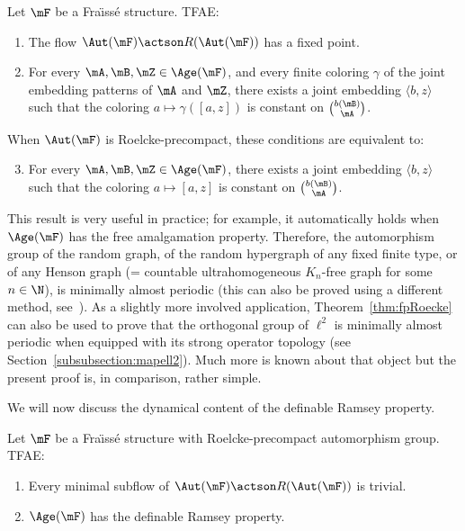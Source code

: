 \begin{theo}\label{thm:fpRoecke}
Let $\mF$ be a Fra\"{\i}ss\'e structure. TFAE:
\begin{enumerate}
\item \label{1.7.1} The flow $\Aut(\mF)\actson R(\Aut(\mF))$ has a fixed point.
\item \label{1.7.2} For every $\mA, \mB, \mZ\in \Age(\mF)$, and every finite coloring $\gamma$ of the joint embedding patterns of $\mA$ and $\mZ$, there exists a joint embedding $\langle b,z\rangle$ such that the coloring $a\mapsto \gamma([a,z])$ is constant on $\binom{b(\mB)}{\mA}$.
\end{enumerate}

When $\Aut(\mF)$ is Roelcke-precompact, these conditions are equivalent to:
\begin{enumerate}
\setcounter{enumi}{2}
\item \label{1.7.3} For every $\mA, \mB, \mZ\in \Age(\mF)$, there exists a joint embedding $\langle b,z\rangle$ such that the coloring $a\mapsto [a,z]$ is constant on $\binom{b(\mB)}{\mA}$.
\end{enumerate}
\end{theo}

This result is very useful in practice; for example, it automatically holds when $\Age(\mF)$ has the free amalgamation property. Therefore, the automorphism group of the random graph, of the random hypergraph of any fixed finite type, or of any Henson graph (= countable ultrahomogeneous $K_{n}$-free graph for some $n\in \N$), is minimally almost periodic (this can also be proved using a different method, see~\cite{NVT8}). As a slightly more involved application, Theorem~\ref{thm:fpRoecke} can also be used to prove that the orthogonal group of $\ell^{2}$ is minimally almost periodic when equipped with its strong operator topology (see Section~\ref{subsubsection:mapell2}). Much more is known about that object but the present proof is, in comparison, rather simple.

We will now discuss the dynamical content of the definable Ramsey property.

\begin{theo}\label{thm:minRoeckeDefRP}
Let $\mF$ be a Fra\"{\i}ss\'e structure with Roelcke-precompact automorphism group. TFAE:
\begin{enumerate}
\item Every minimal subflow of $\Aut(\mF)\actson R(\Aut(\mF))$ is trivial.
\item $\Age(\mF)$ has the definable Ramsey property.
\end{enumerate}
\end{theo}


